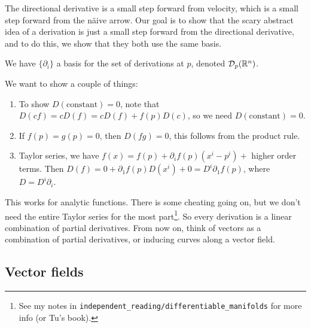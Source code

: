 The directional derivative is a small step forward from velocity, which is a small step forward from the n\"aive arrow. Our goal is to show that the scary abstract idea of a derivation is just a small step forward from the directional derivative, and to do this, we show that they both use the same basis.
\begin{claim}
    We have $\{\partial _i \} $ a basis for the set of derivations at $p$, denoted $\mathcal{D} _p(\mathbb{R}^n )$.
\end{claim}
We want to show a couple of things:
\begin{enumerate}
    \item To show $D( \text{constant} )=0$, note that $D(cf)=cD(f)=cD(f)+f(p)D(c)$, so we need $D(\text{constant} )=0$.
    \item If $f(p)=g(p)=0$, then $D(fg)=0$, this follows from the product rule.
    \item Taylor series, we have $f(x)=f(p)+ \partial _i f(p)(x^i -p^i )+$ higher order terms. Then $D(f)=0+\partial_1f(p)D(x^i )+0 =D^i  \partial_1f(p) $, where $D=D^i  \partial _i $. 
\end{enumerate}
This works for analytic functions. There is some cheating going on, but we don't need the entire Taylor series for the most part\footnote{See my notes in \texttt{independent\_reading/differentiable\_manifolds} for more info (or Tu's book).}. So every derivation is a linear combination of partial derivatives. From now on, think of vectors as a combination of partial derivatives, or inducing curves along a vector field.

\subsection{Vector fields}

